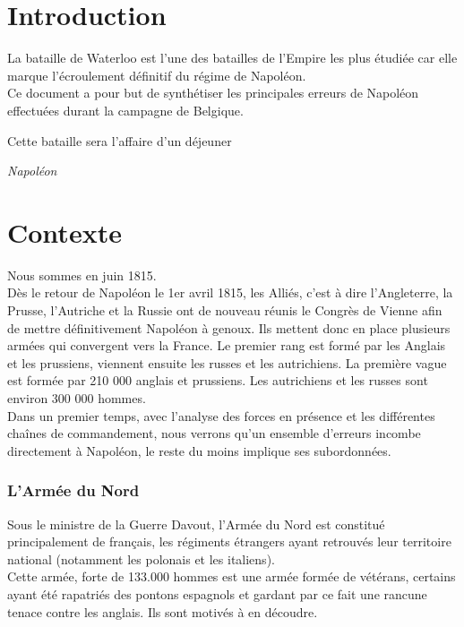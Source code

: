 \newcommand{\wel}{Wellington~}



\chapter{Introduction}

La bataille de Waterloo est l'une des batailles de l'Empire les plus étudiée car elle marque l'écroulement 
définitif du régime de Napoléon. \\
Ce document a pour but de synthétiser les principales erreurs de Napoléon effectuées durant la campagne 
de Belgique.


\epigraph{Cette bataille sera l'affaire d'un déjeuner}{\textit{Napoléon}}

\chapter{Contexte}



Nous sommes en juin 1815.\\
Dès le retour de Napoléon le 1er avril 1815, les Alliés, c'est à dire l'Angleterre, la Prusse, 
l'Autriche et la Russie ont de nouveau réunis le Congrès de Vienne afin de mettre définitivement 
Napoléon à genoux. Ils mettent donc en place plusieurs armées qui convergent vers la France. 
Le premier rang est formé par les Anglais et les prussiens, viennent ensuite les russes et les autrichiens.
La première vague est formée par 210 000 anglais et prussiens.
Les autrichiens et les russes sont environ 300 000 hommes.\\

Dans un premier temps, avec l'analyse des forces en présence et les différentes chaînes de commandement, nous verrons qu'un ensemble d'erreurs incombe directement à Napoléon, le reste du moins implique ses subordonnées.\\

\subsection{L'Armée du Nord}

Sous le ministre de la Guerre Davout, l'Armée du Nord est constitué principalement de français, 
les régiments étrangers ayant retrouvés leur territoire national (notamment les polonais et les italiens). \\
Cette armée, forte de 133.000 hommes est une armée formée de vétérans, certains ayant été rapatriés des 
pontons espagnols et gardant par ce fait une rancune tenace contre les anglais. 
Ils sont motivés à en découdre.\\


